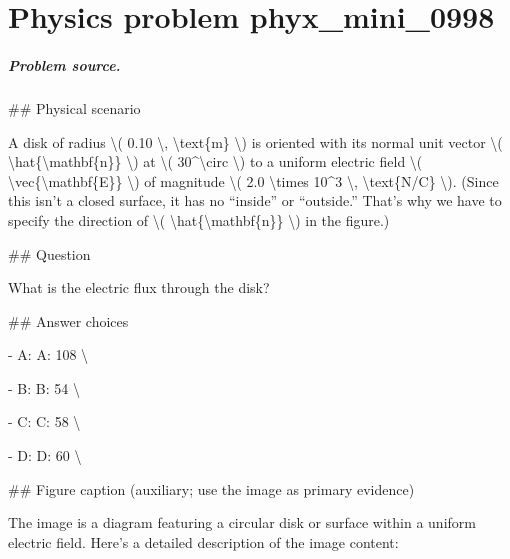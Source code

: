 
\chapter{Physics problem phyx\_mini\_0998}
\label{ch:PhyXMiniProblems_problem_phyx_mini_0998}

\paragraph{Problem source.}
\#\# Physical scenario

A disk of radius \textbackslash{}( 0.10 \textbackslash{}, \textbackslash{}text\{m\} \textbackslash{}) is oriented with its normal unit vector \textbackslash{}( \textbackslash{}hat\{\textbackslash{}mathbf\{n\}\} \textbackslash{}) at \textbackslash{}( 30\textasciicircum{}\textbackslash{}circ \textbackslash{}) to a uniform electric field \textbackslash{}( \textbackslash{}vec\{\textbackslash{}mathbf\{E\}\} \textbackslash{}) of magnitude \textbackslash{}( 2.0 \textbackslash{}times 10\textasciicircum{}3 \textbackslash{}, \textbackslash{}text\{N/C\} \textbackslash{}). (Since this isn't a closed surface, it has no “inside” or “outside.” That's why we have to specify the direction of \textbackslash{}( \textbackslash{}hat\{\textbackslash{}mathbf\{n\}\} \textbackslash{}) in the figure.)

\#\# Question

What is the electric flux through the disk?

\#\# Answer choices

- A: A: 108 \textbackslash{}

- B: B: 54 \textbackslash{}

- C: C: 58 \textbackslash{}

- D: D: 60 \textbackslash{}

\#\# Figure caption (auxiliary; use the image as primary evidence)

The image is a diagram featuring a circular disk or surface within a uniform electric field. Here's a detailed description of the image content:

